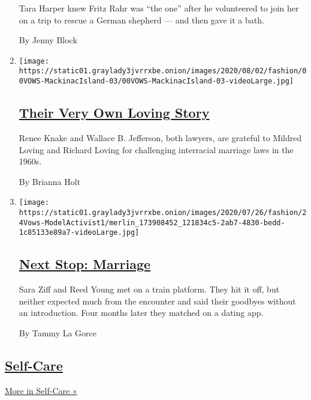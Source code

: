 \begin{enumerate}
  Tara Harper knew Fritz Rahr was ``the one'' after he volunteered to
  join her on a trip to rescue a German shepherd --- and then gave it a
  bath.

  By Jenny Block
\item
  \texttt{[image: https://static01.graylady3jvrrxbe.onion/images/2020/08/02/fashion/00VOWS-MackinacIsland-03/00VOWS-MackinacIsland-03-videoLarge.jpg]}

  \hypertarget{their-very-own-loving-story}{%
  \subsection{\texorpdfstring{\href{/2020/07/31/fashion/weddings/Renee-Knake-and-Wallace-Jefferson-wed-tribute-to-Lovings-before-them.html}{Their
  Very Own Loving
  Story}}{Their Very Own Loving Story}}\label{their-very-own-loving-story}}

  Renee Knake and Wallace B. Jefferson, both lawyers, are grateful to
  Mildred Loving and Richard Loving for challenging interracial marriage
  laws in the 1960s.

  By Brianna Holt
\item
  \texttt{[image: https://static01.graylady3jvrrxbe.onion/images/2020/07/26/fashion/24Vows-ModelActivist1/merlin\_173908452\_121834c5-2ab7-4830-bedd-1c85133e89a7-videoLarge.jpg]}

  \hypertarget{next-stop-marriage}{%
  \subsection{\texorpdfstring{\href{/2020/07/24/fashion/weddings/Sara-Ziff-marries-Reed-Young-at-train-station.html}{Next
  Stop: Marriage}}{Next Stop: Marriage}}\label{next-stop-marriage}}

  Sara Ziff and Reed Young met on a train platform. They hit it off, but
  neither expected much from the encounter and said their goodbyes
  without an introduction. Four months later they matched on a dating
  app.

  By Tammy La Gorce
\end{enumerate}

\hypertarget{self-care}{%
\subsection{\texorpdfstring{\href{/section/style/self-care}{Self-Care}}{Self-Care}}\label{self-care}}

\href{/section/style/self-care}{More in Self-Care »}

